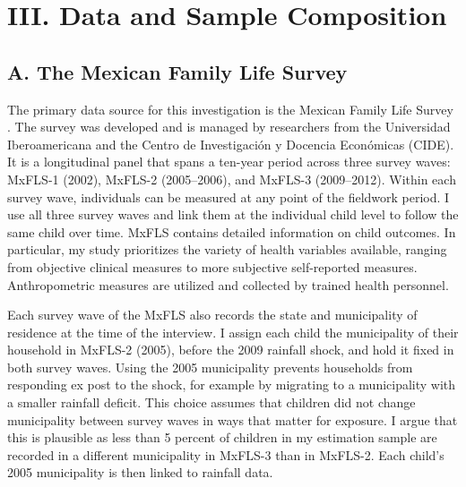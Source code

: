 \documentclass[12pt]{article}
\begin{document}
\section*{III. Data and Sample Composition}\label{sec:III}

\subsection*{A. The Mexican Family Life Survey}

The primary data source for this investigation is the Mexican Family Life Survey \parencite[MxFLS;][]{rubalcavaUsersGuideMexican2006,rubalcavaUsersGuideMexican2013}. The survey was developed and is managed by researchers from the Universidad Iberoamericana and the Centro de Investigaci\'on y Docencia Econ\'omicas (CIDE). It is a longitudinal panel that spans a ten-year period across three survey waves: MxFLS-1 (2002), MxFLS-2 (2005--2006), and MxFLS-3 (2009--2012). Within each survey wave, individuals can be measured at any point of the fieldwork period. I use all three survey waves and link them at the individual child level to follow the same child over time. MxFLS contains detailed information on child outcomes. In particular, my study prioritizes the variety of health variables available, ranging from objective clinical measures to more subjective self-reported measures. Anthropometric measures are utilized and collected by trained health personnel.

Each survey wave of the MxFLS also records the state and municipality of residence at the time of the interview. I assign each child the municipality of their household in MxFLS-2 (2005), before the 2009 rainfall shock, and hold it fixed in both survey waves. Using the 2005 municipality prevents households from responding ex post to the shock, for example by migrating to a municipality with a smaller rainfall deficit. This choice assumes that children did not change municipality between survey waves in ways that matter for exposure. I argue that this is plausible as less than 5 percent of children in my estimation sample are recorded in a different municipality in MxFLS-3 than in MxFLS-2. Each child's 2005 municipality is then linked to rainfall data.
\end{document}
